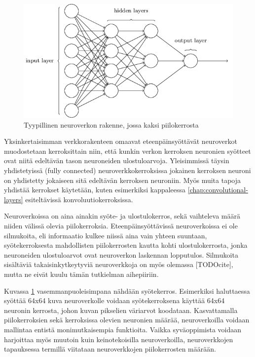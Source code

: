\documentclass[finnish]{tktltiki2}
\theoremstyle{definition}
\theoremstyle{remark}
\begin{document}
  \begin{figure}[h]
    \centering
    \includegraphics[scale=0.5]{basic-neuralnet}
    \caption{Tyypillinen neuroverkon rakenne, jossa kaksi piilokerrosta \cite{Nielsen-neural}}
    \label{pic:neuralnet}
  \end{figure}

  Yksinkertaisimman verkkorakenteen omaavat eteenpäinsyöttävät neuroverkot muodostetaan kerroksittain niin, että kunkin verkon kerroksen neuronien syötteet ovat niitä edeltävän tason neuroneiden ulostuloarvoja. 
  Yleisimmissä täysin yhdistetyissä (fully connected) neuroverkkokerroksissa jokainen kerroksen neuroni on yhdistetty jokaiseen sitä edeltävän kerroksen neuroniin. Myös muita tapoja yhdistää kerrokset käytetään, kuten esimerkiksi kappaleessa \ref{chap:convolutional-layers} esiteltävissä konvoluutiokerroksissa. 
  
  Neuroverkoissa on aina ainakin syöte- ja ulostulokerros, sekä vaihteleva määrä niiden välissä olevia piilokerroksia. Eteenpäinsyöttävissä neuroverkoissa ei ole silmukoita, eli informaatio kulkee niissä aina vain yhteen suuntaan, syötekerroksesta mahdollisten piilokerrosten kautta kohti ulostulokerrosta, jonka neuroneiden ulostuloarvot ovat neuroverkon laskennan lopputulos. Silmukoita sisältäviä takaisinkytkeytyviä neuroverkkoja on myös olemassa [TODOcite], mutta ne eivät kuulu tämän tutkielman aihepiiriin.

  Kuvassa \ref{pic:neuralnet} vasemmanpuoleisimpana nähdään syötekerros. Esimerkiksi haluttaessa syöttää 64x64 kuva neuroverkolle voidaan syötekerroksena käyttää 64x64 neuronin kerrosta, johon kuvan pikselien väriarvot koodataan.
  Kasvattamalla piilokerroksien sekä kerroksissa olevien neuronien määrää, neuroverkoilla voidaan mallintaa entistä monimutkaisempia funktioita. Vaikka syväoppimista voidaan harjoittaa myös muutoin kuin keinotekoisilla neuroverkoilla, neuroverkkojen tapauksessa termillä viitataan neuroverkkojen piilokerrosten määrään. 
\end{document}
